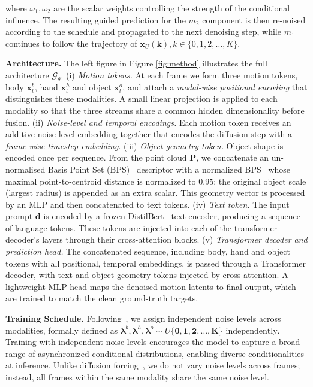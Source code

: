 where $\omega_1,\omega_2$ are the scalar weights controlling the strength of the conditional influence. The resulting guided prediction for the $m_2$ component is then re-noised according to the schedule and propagated to the next denoising step, while $m_1$ continues to follow the trajectory of ${\boldsymbol{x}}_U(\boldsymbol k), k \in \{0,1,2,\ldots,K\}$.  




\noindent\textbf{Architecture.} The left figure in Figure \ref{fig:method} illustrates the full architecture $\mathcal{G}_\theta$.
(i) \emph{Motion tokens.} At each frame we form three motion tokens, body $\boldsymbol{x}_{t}^{b}$, hand $\boldsymbol{x}_{t}^{h}$ and object $\boldsymbol{x}_{t}^{o}$, and attach a \emph{modal-wise positional encoding} that distinguishes these modalities. A small linear projection is applied to each modality so that the three streams share a common hidden dimensionality before fusion.
(ii) \emph{Noise-level and temporal encodings.}  Each motion token receives an additive noise-level embedding  together that encodes the diffusion step with a \emph{frame-wise timestep embedding}.
(iii) \emph{Object-geometry token.}  Object shape is encoded once per sequence. From the point cloud $\boldsymbol{P}$, we concatenate an un-normalised Basis Point Set (BPS)~\citep{prokudin2019efficient} descriptor with a normalized BPS~\citep{zhang2024bimart} whose maximal point-to-centroid distance is normalized to $0.95$; the original object scale (largest radius) is appended as an extra scalar. This geometry vector is processed by an MLP and then concatenated to text tokens.
(iv) \emph{Text token.}  The input prompt $\boldsymbol{d}$ is encoded by a frozen DistilBert~\citep{sanh2019distilbert} text encoder, producing a sequence of language tokens.  These tokens are injected into
each of the transformer decoder’s layers through their cross-attention blocks.
(v) \emph{Transformer decoder and prediction head.}  The concatenated sequence, including body, hand and object tokens with all positional, temporal embeddings, is passed through a Transformer decoder, with text and object-geometry tokens injected by cross-attention. A lightweight MLP head maps the denoised motion latents to final output, which are trained to match the clean ground-truth targets.


\noindent \textbf{Training Schedule.}
Following~\citet{kim2024versatile,xiu2025egotwin,zhang2024tedi,chen2024diffusion}, we assign independent noise levels across modalities, formally defined as $ \boldsymbol\lambda^b, \boldsymbol\lambda^h, \boldsymbol\lambda^o\sim U\{\boldsymbol 0, \boldsymbol 1, \boldsymbol 2, \dots, \boldsymbol K\} \text{ independently}$. Training with independent noise levels encourages the model to capture a broad range of asynchronized conditional distributions, enabling diverse conditionalities at inference. Unlike diffusion forcing~\citep{chen2024diffusion}, we do not vary noise levels across frames; instead, all frames within the same modality share the same noise level. 

